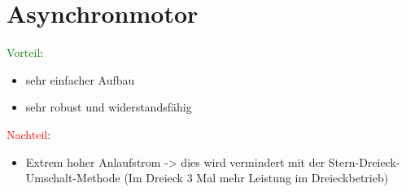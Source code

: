 \section{Asynchronmotor}
\textcolor{green}{Vorteil}: \begin{itemize}
	\item sehr einfacher Aufbau
	\item sehr robust und widerstandsfähig 
\end{itemize}
\textcolor{red}{Nachteil}: \begin{itemize}
	\item Extrem hoher Anlaufstrom \newline
		-> dies wird vermindert mit der Stern-Dreieck-Umschalt-Methode \newline (Im Dreieck 3 Mal mehr Leistung im Dreieckbetrieb)
\end{itemize}

